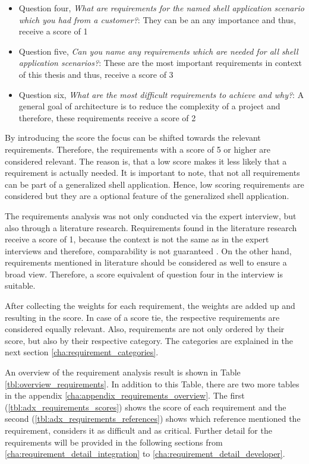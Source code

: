 \begin{itemize}
    \item Question four, \textit{What are requirements for the named shell application scenario which you had from a customer?}: They can be an any importance and thus, receive a score of 1
    \item Question five, \textit{Can you name any requirements which are needed for all shell application scenarios?}: These are the most important requirements in context of this thesis and thus, receive a score of 3
    \item Question six, \textit{What are the most difficult requirements to achieve and why?}: A general goal of architecture is to reduce the complexity of a project \cite[p.~98]{AlSharif.2004} and therefore, these requirements receive a score of 2
\end{itemize}

By introducing the score the focus can be shifted towards the relevant requirements.
Therefore, the requirements with a score of 5 or higher are considered relevant.
The reason is, that a low score makes it less likely that a requirement is actually needed.
It is important to note, that not all requirements can be part of a generalized shell application.
Hence, low scoring requirements are considered but they are a optional feature of the generalized shell application.


The requirements analysis was not only conducted via the expert interview, but also through a literature research.
Requirements found in the literature research receive a score of 1, because the context is not the same as in the expert interviews and therefore, comparability is not guaranteed \cite[p.~35]{AlexanderBognerBeateLittigWolfgangMenz.2009}.
On the other hand, requirements mentioned in literature should be considered as well to ensure a broad view.
Therefore, a score equivalent of question four in the interview is suitable.

After collecting the weights for each requirement, the weights are added up and resulting in the score.
In case of a score tie, the respective requirements are considered equally relevant.
Also, requirements are not only ordered by their score, but also by their respective category.
The categories are explained in the next section \ref{cha:requirement_categories}.

An overview of the requirement analysis result is shown in Table \ref{tbl:overview_requirements}.
In addition to this Table, there are two more tables in the appendix \ref{cha:appendix_requirements_overview}.
The first (\ref{tbl:adx_requirements_scores}) shows the score of each requirement and the second (\ref{tbl:adx_requirements_references}) shows which reference mentioned the requirement, considers it as difficult and as critical.
Further detail for the requirements will be provided in the following sections from  \ref{cha:requirement_detail_integration} to \ref{cha:requirement_detail_developer}.

